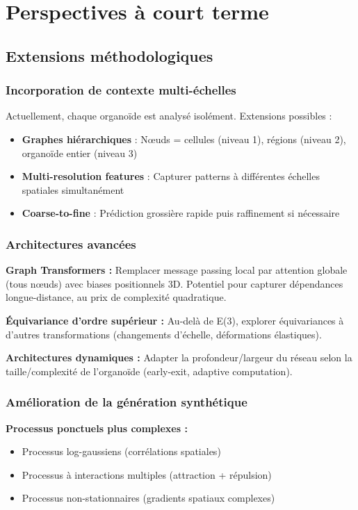 \section{Perspectives à court terme}

\subsection{Extensions méthodologiques}

\subsubsection{Incorporation de contexte multi-échelles}

Actuellement, chaque organoïde est analysé isolément. Extensions possibles :
\begin{itemize}
    \item \textbf{Graphes hiérarchiques} : Nœuds = cellules (niveau 1), régions (niveau 2), organoïde entier (niveau 3)
    \item \textbf{Multi-resolution features} : Capturer patterns à différentes échelles spatiales simultanément
    \item \textbf{Coarse-to-fine} : Prédiction grossière rapide puis raffinement si nécessaire
\end{itemize}

\subsubsection{Architectures avancées}

\textbf{Graph Transformers :}
Remplacer message passing local par attention globale (tous nœuds) avec biases positionnels 3D. Potentiel pour capturer dépendances longue-distance, au prix de complexité quadratique.

\textbf{Équivariance d'ordre supérieur :}
Au-delà de E(3), explorer équivariances à d'autres transformations (changements d'échelle, déformations élastiques).

\textbf{Architectures dynamiques :}
Adapter la profondeur/largeur du réseau selon la taille/complexité de l'organoïde (early-exit, adaptive computation).

\subsubsection{Amélioration de la génération synthétique}

\textbf{Processus ponctuels plus complexes :}
\begin{itemize}
    \item Processus log-gaussiens (corrélations spatiales)
    \item Processus à interactions multiples (attraction + répulsion)
    \item Processus non-stationnaires (gradients spatiaux complexes)
\end{itemize}

